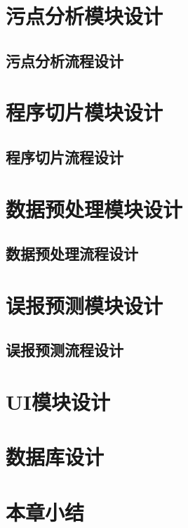 \section{污点分析模块设计}
\subsection{污点分析流程设计}

\section{程序切片模块设计}
\subsection{程序切片流程设计}

\section{数据预处理模块设计}
\subsection{数据预处理流程设计}

\section{误报预测模块设计}
\subsection{误报预测流程设计}

\section{UI模块设计}

\section{数据库设计}

\section{本章小结}